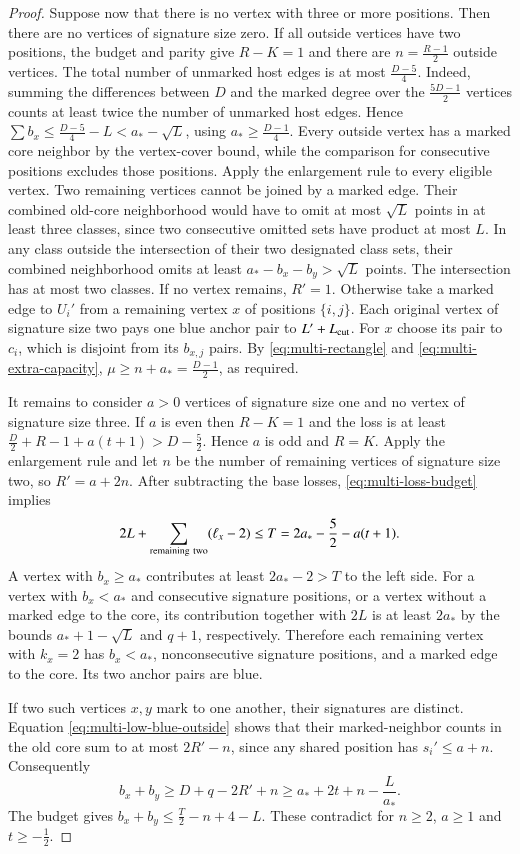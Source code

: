 \begin{proof}
Suppose now that there is no vertex with three or more positions.
Then there are no vertices of signature size zero. If all outside vertices have
two positions, the budget and parity give $R-K=1$ and there are
$n=\frac{R-1}{2}$ outside vertices. The total number of unmarked host
edges is at most $\frac{D-5}{4}$. Indeed, summing the differences
between $D$ and the marked degree over the $\frac{5D-1}{2}$ vertices
counts at least twice the number of unmarked host edges.
Hence $\sum b_x\le \frac{D-5}{4}-L<a_*-\sqrt L$,
using $a_*\ge\frac{D-1}{4}$. Every outside vertex has a marked core
neighbor by the vertex-cover bound, while the comparison for
consecutive positions excludes those positions. Apply the enlargement
rule to every eligible vertex. Two remaining vertices cannot be joined
by a marked edge.
Their combined old-core neighborhood would have to omit at most
$\sqrt L$ points in at least three classes, since two consecutive
omitted sets have product at most $L$. In any class outside the
intersection of their two designated class sets, their combined
neighborhood omits at least $a_*-b_x-b_y>\sqrt L$ points. The
intersection has at most two classes. If no vertex remains, $R'=1$.
Otherwise take a marked edge to $U_i'$ from a remaining vertex $x$
of positions $\{i,j\}$. Each original vertex of signature size two pays
one blue anchor pair to $L'+L_{\rm cut}$. For $x$ choose its pair
to $c_i$, which is disjoint from its $b_{x,j}$ pairs. By
\eqref{eq:multi-rectangle} and \eqref{eq:multi-extra-capacity},
$\mu\ge n+a_*=\frac{D-1}{2}$, as required.

It remains to consider $a>0$ vertices of signature size one and no
vertex of signature size three. If $a$ is even then $R-K=1$ and the loss
is at least $\frac{D}{2}+R-1+a(t+1)>D-\frac{5}{2}$. Hence $a$ is odd and $R=K$.
Apply the enlargement rule and let $n$ be the number of remaining
vertices of signature size two, so $R'=a+2n$. After subtracting the base
losses, \eqref{eq:multi-loss-budget} implies
\[
 2L+\sum_{\rm remaining\ two}(\ell_x-2)
 \le T=2a_*-\frac{5}{2}-a(t+1).
\]
A vertex with $b_x\ge a_*$ contributes at least $2a_*-2>T$ to the
left side. For a vertex with $b_x<a_*$ and consecutive signature
positions, or a vertex without a marked edge to the core, its
contribution together with $2L$ is at least $2a_*$ by the bounds
$a_*+1-\sqrt L$ and $q+1$, respectively. Therefore each remaining
vertex with $k_x=2$ has $b_x<a_*$, nonconsecutive signature positions,
and a marked edge to the core. Its two anchor pairs are blue.

If two such vertices $x,y$ mark to one another, their signatures
are distinct. Equation \eqref{eq:multi-low-blue-outside} shows that
their marked-neighbor counts in the old core sum to at most
$2R'-n$, since any shared position has $s_i'\le a+n$.
Consequently
\[
 b_x+b_y\ge D+q-2R'+n\ge a_*+2t+n-\frac{L}{a_*}.
\]
The budget gives $b_x+b_y\le \frac{T}{2}-n+4-L$. These contradict for
$n\ge2$, $a\ge1$ and $t\ge-\frac{1}{2}$.


\end{proof}
